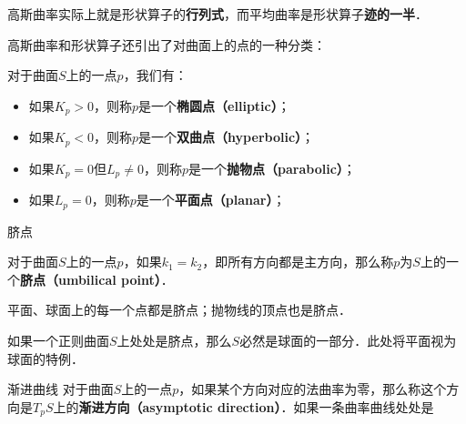 高斯曲率实际上就是形状算子的\textbf{行列式}，而平均曲率是形状算子\textbf{迹的一半}．

高斯曲率和形状算子还引出了对曲面上的点的一种分类：

\begin{definition}{}
对于曲面$S$上的一点$p$，我们有：
\begin{itemize}
\item 如果$K_p>0$，则称$p$是一个\textbf{椭圆点（elliptic）}；
\item 如果$K_p<0$，则称$p$是一个\textbf{双曲点（hyperbolic）}；
\item 如果$K_p=0$但$L_p\not=0$，则称$p$是一个\textbf{抛物点（parabolic）}；
\item 如果$L_p=0$，则称$p$是一个\textbf{平面点（planar）}；
\end{itemize}
\end{definition}


\begin{definition}{脐点}

对于曲面$S$上的一点$p$，如果$k_1=k_2$，即所有方向都是主方向，那么称$p$为$S$上的一个\textbf{脐点（umbilical point）}．

\end{definition}

平面、球面上的每一个点都是脐点；抛物线的顶点也是脐点．

\begin{theorem}{}
如果一个正则曲面$S$上处处是脐点，那么$S$必然是球面的一部分．此处将平面视为球面的特例．
\end{theorem}

\begin{definition}{渐进曲线}
对于曲面$S$上的一点$p$，如果某个方向对应的法曲率为零，那么称这个方向是$T_pS$上的\textbf{渐进方向（asymptotic direction）}．如果一条曲率曲线处处是
\end{definition}

